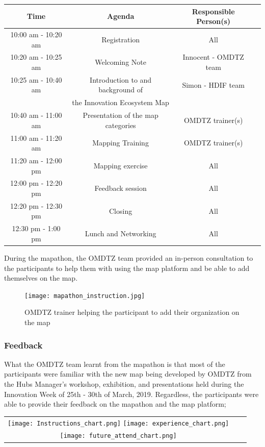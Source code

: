 \documentclass[a4paper,12pt,twoside]{article}
\begin{document}
\begin{tabular}{|c|c|c|c|}
	\hline
	\rowcolor{Gray}
	\bfseries Time & Agenda & Responsible Person(s)\\
	\hline
	10:00 am - 10:20 am & Registration & All\\
	\hline
	10:20 am - 10:25 am & Welcoming Note & Innocent - OMDTZ team\\
	\hline
	10:25 am - 10:40 am & Introduction to and background of & Simon - HDIF team\\
	{} &  the Innovation Ecosystem Map & {}\\
	\hline
	10:40 am - 11:00 am	& Presentation of the map categories & OMDTZ trainer(s)\\
	\hline
	11:00 am - 11:20 am & Mapping Training & OMDTZ trainer(s)\\
	\hline
	11:20 am - 12:00 pm & Mapping exercise & All\\
	\hline
	12:00 pm - 12:20 pm & Feedback session & All\\
	\hline
	12:20 pm - 12:30 pm & Closing & All\\
	\hline
	12:30 pm - 1:00 pm & Lunch and Networking & All\\
	\hline
\end{tabular}

During the mapathon, the OMDTZ team provided an in-person consultation to the participants to help them with using the map platform and be able to add themselves on the map.
\begin{figure}
	\centering
	\texttt{[image: mapathon\_instruction.jpg]}
	\caption{OMDTZ trainer helping the participant to add their organization on the map}
\end{figure}

\subsubsection{Feedback}
What the OMDTZ team learnt from the mapathon is that most of the participants were familiar with the new map being developed by OMDTZ from the Hubs Manager’s workshop, exhibition, and presentations held during the Innovation Week of 25th - 30th of March, 2019. Regardless, the participants were able to provide their feedback on the mapathon and the map platform;

\begin{tabular}{c|c|c}
	\texttt{[image: Instructions\_chart.png]} \texttt{[image: experience\_chart.png]}\\
	\texttt{[image: future\_attend\_chart.png]}\\
\end{tabular}
\end{document}
